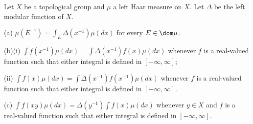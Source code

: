  Let $X$ be a topological group and $\mu$ a
left Haar measure on $X$.   Let $\Delta$ be the left modular function of
$X$.

(a) $\mu(E^{-1})=\int_E\Delta(x^{-1})\mu(dx)$ for every $E\in\dom\mu$.

(b)(i) $\int f(x^{-1})\mu(dx)=\int\Delta(x^{-1})f(x)\mu(dx)$
whenever $f$ is a real-valued function such that either integral is
defined in $[-\infty,\infty]$;

\quad(ii) $\int f(x)\mu(dx)=\int\Delta(x^{-1})f(x^{-1})\mu(dx)$
whenever $f$ is a real-valued function such that either integral is
defined in $[-\infty,\infty]$.

(c) $\int f(xy)\mu(dx)=\Delta(y^{-1})\int f(x)\mu(dx)$ whenever $y\in X$
and $f$ is a real-valued function such that either integral is defined
in $[-\infty,\infty]$.

